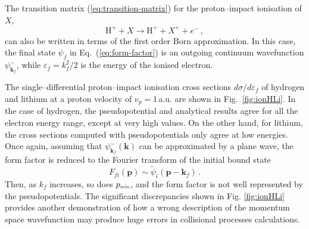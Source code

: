 \documentclass[10pt]{article}
\begin{document}
The transition matrix (\ref{eq:transition-matrix}) for the 
proton--impact ionisation of $X$,
\begin{equation}
 \mbox{H}^+ + X \rightarrow \mbox{H}^+ + X^+ + e^-\,,
\end{equation}
can also be written in terms of the first order Born
approximation. In this case, the final state $\psi_{\!f}$ in 
Eq.~(\ref{eq:form-factor}) is an outgoing continuum 
wavefunction $\psi_{\mathbf{k}_{\!f}}^-$, while 
$\varepsilon_{\!f}=k_{\!f}^2/2$ is the energy of the ionised electron. 

The single--differential proton--impact ionisation cross sections 
$d\sigma/d\varepsilon_{\!f}$ of hydrogen and lithium at a proton 
velocity of $v_p=1$\,a.u. 
are shown in Fig.~\ref{fig:ionHLi}. 
In the case of hydrogen, the pseudopotential and analytical results
agree for all the electron energy range, except at very high values. 
On the other hand, for lithium, the cross sections computed with 
pseudopotentials only agree at low energies. 
Once again, assuming that $\psi_{\mathbf{k}_{\!f}}^-(\mathbf{k})$ can be 
approximated by a plane wave, the form factor is reduced to the 
Fourier transform of the initial bound state
\begin{equation}
 F_{\!fi}(\mathbf{p})\sim\widetilde{\psi}_i(\mathbf{p}-\mathbf{k}_{\!f})\,.
\end{equation}
Then, as $k_{\!f}$ increases, so does $p_{\mbox{\tiny min}}$, and the form
factor is not well represented by the pseudopotentials. The significant 
discrepancies shown in Fig. \ref{fig:ionHLi} provides another demonstration
of how a wrong description of the momentum space wavefunction may
produce huge errors in collisional processes calculations.
\end{document}

